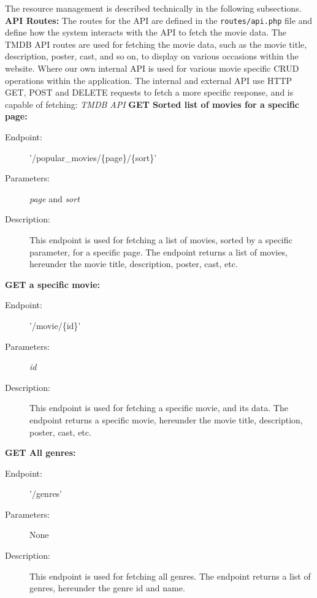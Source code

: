 The resource management is described technically in the following subsections. \newline
\textbf{API Routes:}
The routes for the API are defined in the \texttt{routes/api.php} file and define how the system interacts with the API to fetch the movie data. The TMDB API routes are used for fetching the movie data, such as the movie title, description, poster, cast, and so on, to display on various occasions within the website. Where our own internal API is used for various movie specific CRUD operations within the application. 
The internal and external API use HTTP GET, POST and DELETE requests to fetch a more specific response, and is capable of fetching: \newline
\textit{TMDB API} \newline\newline
\textbf{GET Sorted list of movies for a specific page:}
\begin{description}
    \item[Endpoint:] '/popular\_movies/\{page\}/\{sort\}'
    \item[Parameters:] \textit{page} and \textit{sort}
    \item[Description:] This endpoint is used for fetching a list of movies, sorted by a specific parameter, for a specific page. The endpoint returns a list of movies, hereunder the movie title, description, poster, cast, etc.
\end{description} 
\textbf{GET a specific movie:}
\begin{description}
    \item [Endpoint:] '/movie/\{id\}'
    \item [Parameters:] \textit{id}
    \item [Description:] This endpoint is used for fetching a specific movie, and its data. The endpoint returns a specific movie, hereunder the movie title, description, poster, cast, etc.
\end{description} 
\textbf{GET All genres:}
\begin{description}
    \item [Endpoint:] '/genres'
    \item [Parameters:] None
    \item [Description:] This endpoint is used for fetching all genres. The endpoint returns a list of genres, hereunder the genre id and name. \newline
\end{description}

